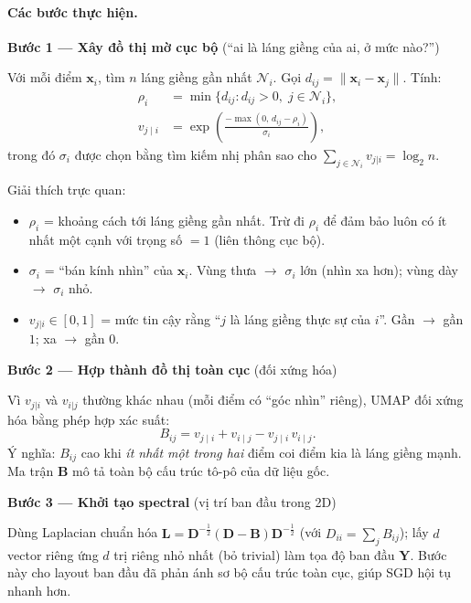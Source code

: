 \paragraph{Các bước thực hiện.}

\textbf{Bước 1 --- Xây đồ thị mờ cục bộ} (``ai là láng giềng của ai, ở mức nào?'')

Với mỗi điểm $\mathbf{x}_i$, tìm $n$ láng giềng gần nhất $\mathcal{N}_i$. Gọi $d_{ij} = \|\mathbf{x}_i - \mathbf{x}_j\|$. Tính:
\begin{align}
\rho_i &= \min\{ d_{ij} : d_{ij} > 0,\; j \in \mathcal{N}_i \}, \\
v_{j \mid i} &= \exp\!\left(\frac{-\max(0,\, d_{ij} - \rho_i)}{\sigma_i}\right),
\end{align}
trong đó $\sigma_i$ được chọn bằng tìm kiếm nhị phân sao cho $\sum_{j \in \mathcal{N}_i} v_{j|i} = \log_2 n$.

Giải thích trực quan:
\begin{itemize}
  \item $\rho_i$ = khoảng cách tới láng giềng gần nhất. Trừ đi $\rho_i$ để đảm bảo luôn có ít nhất một cạnh với trọng số $= 1$ (liên thông cục bộ).
  \item $\sigma_i$ = ``bán kính nhìn'' của $\mathbf{x}_i$. Vùng thưa $\to$ $\sigma_i$ lớn (nhìn xa hơn); vùng dày $\to$ $\sigma_i$ nhỏ.
  \item $v_{j|i} \in [0,1]$ = mức tin cậy rằng ``$j$ là láng giềng thực sự của $i$''. Gần $\to$ gần $1$; xa $\to$ gần $0$.
\end{itemize}

\textbf{Bước 2 --- Hợp thành đồ thị toàn cục} (đối xứng hóa)

Vì $v_{j|i}$ và $v_{i|j}$ thường khác nhau (mỗi điểm có ``góc nhìn'' riêng), UMAP đối xứng hóa bằng phép hợp xác suất:
\begin{equation}
B_{ij} = v_{j \mid i} + v_{i \mid j} - v_{j \mid i}\, v_{i \mid j}.
\label{eq:umap-fuzzy-union}
\end{equation}
Ý nghĩa: $B_{ij}$ cao khi \emph{ít nhất một trong hai} điểm coi điểm kia là láng giềng mạnh. Ma trận $\mathbf{B}$ mô tả toàn bộ cấu trúc tô-pô của dữ liệu gốc.

\textbf{Bước 3 --- Khởi tạo spectral} (vị trí ban đầu trong 2D)

Dùng Laplacian chuẩn hóa $\mathbf{L} = \mathbf{D}^{-\frac{1}{2}}(\mathbf{D}-\mathbf{B})\mathbf{D}^{-\frac{1}{2}}$ (với $D_{ii} = \sum_j B_{ij}$); lấy $d$ vector riêng ứng $d$ trị riêng nhỏ nhất (bỏ trivial) làm tọa độ ban đầu $\mathbf{Y}$. Bước này cho layout ban đầu đã phản ánh sơ bộ cấu trúc toàn cục, giúp SGD hội tụ nhanh hơn.

